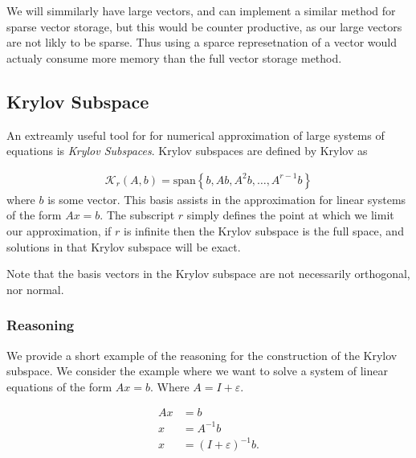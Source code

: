 \documentclass[../fem.tex]{subfiles}
\begin{document}
We will simmilarly have large vectors, and can implement a similar method for
sparse vector storage, but this would be counter productive, as our large
vectors are not likly to be sparse. Thus using a sparce represetnation of a
vector would actualy consume more memory than the full vector storage method.

\subsection{Krylov Subspace}%
\label{sub:krylov_subspace}

An extreamly useful tool for for numerical approximation of large systems of
equations is \textit{Krylov Subspaces}. Krylov subspaces are defined by
Krylov\cite{KRYLOV} as

\begin{align*}
  \mathcal{K}_r\left(A,b\right)=\text{span}\left\{b,Ab,A^2b,\ldots,A^{r-1}b\right\}
\end{align*}
where $b$ is some vector. This basis assists in the approximation for linear
systems of the form $Ax=b$. The subscript $r$ simply defines the point at which
we limit our approximation, if $r$ is infinite then the Krylov subspace is the
full space, and solutions in that Krylov subspace will be exact.

Note that the basis vectors in the Krylov subspace are not necessarily
orthogonal, nor normal.

\subsubsection{Reasoning}%
\label{ssub:reasoning}

We provide a short example of the reasoning for the construction of the Krylov
subspace. We consider the example where we want to solve a system of linear
equations of the form $Ax=b$. Where $A=I+\varepsilon$.

\begin{align*}
  Ax&=b\\
  x&=A^{-1}b\\
  x&=(I+\varepsilon)^{-1}b.
\end{align*}
\end{document}

